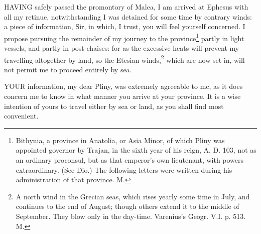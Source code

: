 HAVING safely passed the promontory of Malea, I am arrived at Ephesus with
all my retinue, notwithstanding I was detained for some time by contrary
winds: a piece of information, Sir, in which, I trust, you will feel
yourself concerned. I propose pursuing the remainder of my journey to the
province\footnote{Bithynia, a province
in Anatolia, or Asia Minor, of which Pliny was appointed governor by
Trajan, in the sixth year of his reign, A. D. 103, not as an ordinary
proconsul, but as that emperor's own lieutenant, with powers
extraordinary. (See Dio.) The following letters were written during his
administration of that province. M.} partly in light vessels, and partly in
post-chaises: for as the excessive heats will prevent my travelling
altogether by land, so the Etesian winds,\footnote{A north wind in the
Grecian seas, which rises yearly some time in July, and continues to the
end of August; though others extend it to the middle of September. They
blow only in the day-time. Varenius's Geogr. V.I. p. 513. M.} which are now set
in, will not permit me to proceed entirely by sea.


YOUR information, my dear Pliny, was extremely agreeable to mc, as it does
concern me to know in what manner you arrive at your province. It is a
wise intention of yours to travel either by sea or land, as you shall find
most convenient.


